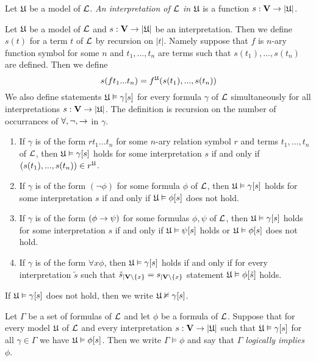 \begin{definition}
Let ${\mathfrak U}$ be a model of ${\mathcal L}$. \textit{An interpretation of ${\mathcal L}$ in ${\mathfrak U}$} is a function $s:\mathbf{V}\rightarrow |{\mathfrak U}|$.
\end{definition}
\noindent
Let ${\mathfrak U}$ be a model of ${\mathcal L}$ and $s:\mathbf{V}\rightarrow |{\mathfrak U}|$ be an interpretation. Then we define $s(t)$ for a term $t$ of ${\mathcal L}$ by recursion on $|t|$. Namely suppose that $f$ is $n$-ary function symbol for some $n$ and $t_1, ..., t_n$ are terms such that $s(t_1),...,s(t_n)$ are defined. Then we define
$$s(ft_1...t_n)= f^{{\mathfrak U}}(s(t_1),...,s(t_n))$$
We also define statements ${\mathfrak U} \vDash \gamma[s]$ for every formula $\gamma$ of ${\mathcal L}$ simultaneously for all interpretations $s:\mathbf{V} \rightarrow |{\mathfrak U}|$. The definition is recursion on the number of occurrances of $\forall, \neg, \rightarrow$ in $\gamma$.
\begin{enumerate}[label=\textbf{(\arabic*)}, leftmargin=3.0em]
\item If $\gamma$ is of the form $rt_1 ...t_n$ for some $n$-ary relation symbol $r$ and terms $t_1,...,t_n$ of ${\mathcal L}$, then ${\mathfrak U} \vDash \gamma[s]$ holds for some interpretation $s$ if and only if $\left(s(t_1),...,s(t_n)\right) \in r^{\mathfrak U}$.
\item If $\gamma$ is of the form $(\neg \phi)$ for some formula $\phi$ of ${\mathcal L}$, then ${\mathfrak U} \vDash \gamma[s]$ holds for some interpretation $s$ if and only if ${\mathfrak U} \vDash \phi[s]$ does not hold.
\item If $\gamma$ is of the form $(\phi \rightarrow \psi)$ for some formulas $\phi, \psi$ of ${\mathcal L}$, then ${\mathfrak U} \vDash \gamma[s]$ holds for some interpretation $s$ if and only if ${\mathfrak U} \vDash \psi[s]$ holds or ${\mathfrak U} \vDash \phi[s]$ does not hold.
\item If $\gamma$ is of the form $\forall x \phi$, then ${\mathfrak U} \vDash \gamma[s]$ holds if and only if for every interpretation $\tilde{s}$ such that $\tilde{s}_{\mid \mathbf{V}\setminus \{x\}} = s_{\mid \mathbf{V}\setminus \{x\}}$ statement ${\mathfrak U} \vDash \phi[\tilde{s}]$ holds.
\end{enumerate}
If ${\mathfrak U} \vDash \gamma[s]$ does not hold, then we write ${\mathfrak U} \nvDash \gamma[s]$.

\begin{definition}
Let $\Gamma$ be a set of formulas of ${\mathcal L}$ and let $\phi$ be a formula of ${\mathcal L}$. Suppose that for every model ${\mathfrak U}$ of ${\mathcal L}$ and every interpretation $s:\mathbf{V} \rightarrow |{\mathfrak U}|$ such that ${\mathfrak U} \vDash \gamma[s]$ for all $\gamma \in \Gamma$ we have ${\mathfrak U} \vDash \phi[s]$. Then we write $\Gamma \vDash \phi$ and say that \textit{$\Gamma$ logically implies $\phi$}.
\end{definition}

